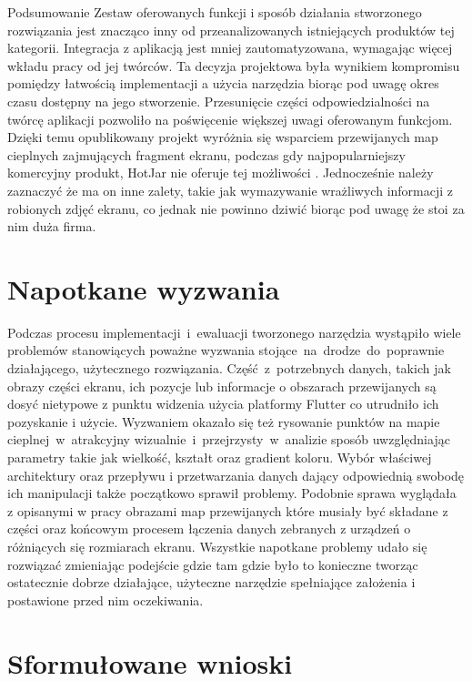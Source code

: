 \begin{chapter}{Podsumowanie}
	Zestaw oferowanych funkcji i sposób działania stworzonego rozwiązania jest znacząco inny od przeanalizowanych istniejących produktów tej kategorii. Integracja z aplikacją jest mniej zautomatyzowana, wymagając więcej wkładu pracy od jej twórców. Ta decyzja projektowa była wynikiem kompromisu pomiędzy łatwością implementacji a użycia narzędzia biorąc pod uwagę okres czasu dostępny na jego stworzenie. Przesunięcie części odpowiedzialności na twórcę aplikacji pozwoliło na poświęcenie większej uwagi oferowanym funkcjom. Dzięki temu opublikowany projekt wyróżnia się wsparciem przewijanych map cieplnych zajmujących fragment ekranu, podczas gdy najpopularniejszy komercyjny produkt, HotJar nie oferuje tej możliwości \cite{Hotjar_limitations}. Jednocześnie należy zaznaczyć że ma on inne zalety, takie jak wymazywanie wrażliwych informacji z robionych zdjęć ekranu, co jednak nie powinno dziwić biorąc pod uwagę że stoi za nim duża firma.
		
	\section{Napotkane wyzwania}
	Podczas procesu implementacji~i~ewaluacji tworzonego narzędzia wystąpiło wiele problemów stanowiących poważne wyzwania stojące~na~drodze~do~poprawnie działającego, użytecznego rozwiązania. Część~z~potrzebnych danych, takich jak obrazy części ekranu, ich pozycje lub informacje o obszarach przewijanych są dosyć nietypowe z punktu widzenia użycia platformy Flutter co utrudniło ich pozyskanie i użycie. Wyzwaniem okazało się też rysowanie punktów na mapie cieplnej~w~atrakcyjny wizualnie~i~przejrzysty~w~analizie sposób uwzględniając parametry takie jak wielkość, kształt oraz gradient koloru. Wybór właściwej architektury oraz przepływu i przetwarzania danych dający odpowiednią swobodę ich manipulacji także początkowo sprawił problemy. Podobnie sprawa wyglądała z opisanymi w pracy obrazami map przewijanych które musiały być składane z części oraz końcowym procesem łączenia danych zebranych z urządzeń o różniących się rozmiarach ekranu. Wszystkie napotkane problemy udało się rozwiązać zmieniając podejście gdzie tam gdzie było to konieczne tworząc ostatecznie dobrze działające, użyteczne narzędzie spełniające założenia i postawione przed nim oczekiwania.
	
	\section{Sformułowane wnioski}

\end{chapter}
